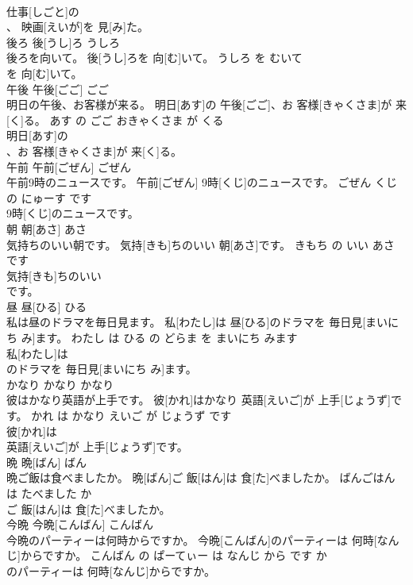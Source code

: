 \documentclass[8pt]{extreport}
\begin{document}
\begin{CJK}{UTF8}{min}
\\	仕事[しごと]の
\\	、 映画[えいが]を 見[み]た。			
\\	後ろ	後[うし]ろ	うしろ	
\\	後ろを向いて。	後[うし]ろを 向[む]いて。	うしろ を むいて	
\\	を 向[む]いて。			
\\	午後	午後[ごご]	ごご	
\\	明日の午後、お客様が来る。	明日[あす]の 午後[ごご]、お 客様[きゃくさま]が 来[く]る。	あす の ごご おきゃくさま が くる	
\\	明日[あす]の
\\	、お 客様[きゃくさま]が 来[く]る。			
\\	午前	午前[ごぜん]	ごぜん	
\\	午前9時のニュースです。	午前[ごぜん] 9時[くじ]のニュースです。	ごぜん くじ の にゅーす です	
\\	9時[くじ]のニュースです。			
\\	朝	朝[あさ]	あさ	
\\	気持ちのいい朝です。	気持[きも]ちのいい 朝[あさ]です。	きもち の いい あさ です	
\\	気持[きも]ちのいい
\\	です。			
\\	昼	昼[ひる]	ひる	
\\	私は昼のドラマを毎日見ます。	私[わたし]は 昼[ひる]のドラマを 毎日見[まいにち み]ます。	わたし は ひる の どらま を まいにち みます	
\\	私[わたし]は
\\	のドラマを 毎日見[まいにち み]ます。			
\\	かなり	かなり	かなり	
\\	彼はかなり英語が上手です。	彼[かれ]はかなり 英語[えいご]が 上手[じょうず]です。	かれ は かなり えいご が じょうず です	
\\	彼[かれ]は
\\	英語[えいご]が 上手[じょうず]です。			
\\	晩	晩[ばん]	ばん	
\\	晩ご飯は食べましたか。	晩[ばん]ご 飯[はん]は 食[た]べましたか。	ばんごはん は たべました か	
\\	ご 飯[はん]は 食[た]べましたか。			
\\	今晩	今晩[こんばん]	こんばん	
\\	今晩のパーティーは何時からですか。	今晩[こんばん]のパーティーは 何時[なんじ]からですか。	こんばん の ぱーてぃー は なんじ から です か	
\\	のパーティーは 何時[なんじ]からですか。			

\end{CJK}
\end{document}
